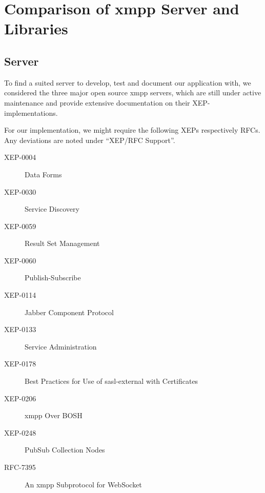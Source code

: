 \section{Comparison of \gls{xmpp} Server and Libraries}\label{sec:comparison-of-xmpp-server-and-libraries}


\subsection{Server}

To find a suited server to develop, test and document our application with, we considered the three major open source \gls{xmpp} servers, which are still under active maintenance and provide extensive documentation on their XEP-implementations.

For our implementation, we might require the following XEPs respectively RFCs. Any deviations are noted under ``XEP/RFC Support''.

\begin{description}
    \item[XEP-0004] Data Forms
    \item[XEP-0030] Service Discovery
    \item[XEP-0059] Result Set Management
    \item[XEP-0060] Publish-Subscribe
    \item[XEP-0114] Jabber Component Protocol
    \item[XEP-0133] Service Administration
    \item[XEP-0178] Best Practices for Use of \gls{sasl-external} with Certificates
    \item[XEP-0206] \gls{xmpp} Over BOSH
    \item[XEP-0248] PubSub Collection Nodes
    \item[RFC-7395] An \gls{xmpp} Subprotocol for WebSocket
\end{description}

